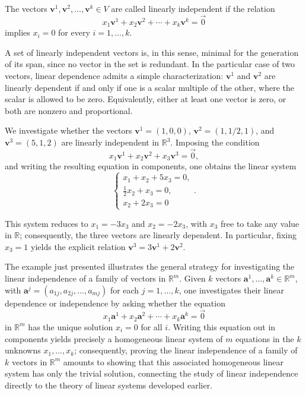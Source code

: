 \begin{definition}
The vectors $\mathbf{v}^1, \mathbf{v}^2, \dots, \mathbf{v}^k \in V$ are called linearly independent if the relation
\[
x_1 \mathbf{v}^1 + x_2 \mathbf{v}^2 + \cdots + x_k \mathbf{v}^k = \vec{0}
\]
 implies $x_i = 0$ for every $i = 1, \dots, k$.
\end{definition}

A set of linearly independent vectors is, in this sense, minimal for the generation of its span, since no vector in the set is redundant. In the particular case of two vectors, linear dependence admits a simple characterization: $\mathbf{v}^1$ and $\mathbf{v}^2$ are linearly dependent if and only if one is a scalar multiple of the other, where the scalar is allowed to be zero. Equivalently, either at least one vector is zero, or both are nonzero and proportional.

\begin{example}
We investigate whether the vectors $\mathbf{v}^1 = (1,0,0)$, $\mathbf{v}^2 = (1, 1/2, 1)$, and $\mathbf{v}^3 = (5,1,2)$ are linearly independent in $\mathbb{R}^3$. Imposing the condition
\[
x_1 \mathbf{v}^1 + x_2 \mathbf{v}^2 + x_3 \mathbf{v}^3 = \vec{0},
\]
and writing the resulting equation in components, one obtains the linear system
\[
\begin{cases}
x_1 + x_2 + 5 x_3 = 0, \\
\tfrac{1}{2} x_2 + x_3 = 0, \\
x_2 + 2 x_3 = 0
\end{cases}.
\]

This system reduces to $x_1 = -3x_3$ and $x_2 = -2x_3$, with $x_3$ free to take any value in $\mathbb{R}$; consequently, the three vectors are linearly dependent. In particular, fixing $x_3 = 1$ yields the explicit relation $\mathbf{v}^3 = 3\mathbf{v}^1 + 2\mathbf{v}^2$.
\end{example}

The example just presented illustrates the general strategy for investigating the linear independence of a family of vectors in $\mathbb{R}^m$. Given $k$ vectors $\mathbf{a}^1, \dots, \mathbf{a}^k \in \mathbb{R}^m$, with $\mathbf{a}^j = (a_{1j}, a_{2j}, \dots, a_{mj})$ for each $j = 1, \dots, k$, one investigates their linear dependence or independence by asking whether the equation
\[
x_1 \mathbf{a}^1 + x_2 \mathbf{a}^2 + \cdots + x_k \mathbf{a}^k = \vec{0}
\]
 in $\mathbb{R}^m$ has the unique solution $x_i = 0$ for all $i$. Writing this equation out in components yields precisely a homogeneous linear system of $m$ equations in the $k$ unknowns $x_1, \dots, x_k$; consequently, proving the linear independence of a family of $k$ vectors in $\mathbb{R}^m$ amounts to showing that this associated homogeneous linear system has only the trivial solution, connecting the study of linear independence directly to the theory of linear systems developed earlier.

